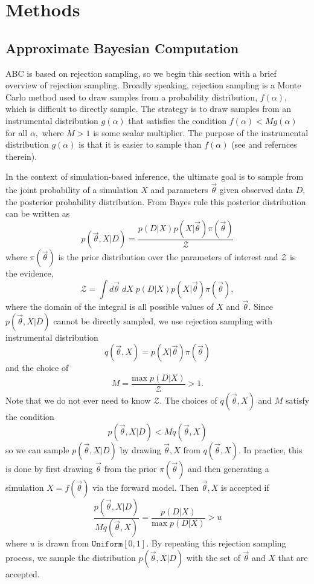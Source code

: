 \documentclass[fleqn,usenatbib]{mnras}
\newcommand{\beq}{\begin{equation}}
\newcommand{\eeq}{\end{equation}}
\newcommand{\pars}{\vec{\theta}}
\begin{document}
\section{Methods}\label{sec:method}
\subsection{Approximate Bayesian Computation} \label{sec:abc}
ABC is based on rejection sampling, so we begin this section with a brief overview of 
rejection sampling. Broadly speaking, rejection sampling is a Monte Carlo method 
used to draw samples from a probability distribution, $f(\alpha)$, which is difficult to directly sample. The strategy is to draw samples from an instrumental distribution $g(\alpha)$ that satisfies the condition $f(\alpha) < M g(\alpha)$ for all $\alpha,$ where $M > 1$ is some scalar multiplier. The purpose of the instrumental distribution $g(\alpha)$ is that it is easier to sample than $f(\alpha)$ (see \citealt{bishop} and refernces therein). 

In the context of simulation-based inference, 
the ultimate goal is to sample from the joint probability of a
simulation $X$ and parameters $\pars$ given observed data $D$, the
posterior probability distribution. From Bayes rule this posterior 
distribution can be written as 
\beq
p(\pars, X | D) = \frac{p(D|X)p(X|\pars)\pi(\pars)}{\mathcal{Z}}
\eeq
where $\pi(\pars)$ is the prior distribution over the parameters of 
interest and $\mathcal{Z}$ is the evidence, 
\beq
\mathcal{Z} = \int d\pars \; dX\; p(D|X) p(X|\pars) \pi(\pars), 
\eeq
where the domain of the integral is all possible values of $X$ and $\pars$. 
Since $p(\pars, X | D)$ cannot be directly sampled, we use rejection 
sampling with instrumental distribution 
\beq
q(\pars, X) = p(X|\pars) \pi(\pars)
\eeq
and the choice of 
\beq
M = \frac{\mathrm{max}\; p(D|X)}{\mathcal{Z}} > 1.
\eeq
Note that we do not ever need to know $\mathcal{Z}$. 
The choices of $q(\pars, X)$ and $M$ satisfy the condition 
\beq
p(\pars, X | D) < M q(\pars, X)
\eeq
so we can sample $p(\pars, X | D)$ by drawing ${\pars, X}$ from $q(\pars, X)$.
In practice, this is done 
by first drawing $\pars$ from the prior $\pi(\pars)$ and then generating a 
simulation $X = f(\pars)$ via the forward model. Then ${\pars, X}$ 
is accepted if
\beq \label{eq:reject_samp}
\frac{p(\pars, X | D)}{M q(\pars, X)} = \frac{p(D|X)}{\mathrm{max}\;p(D|X)} > u 
\eeq
where $u$ is drawn from $\mathtt{Uniform}[0,1]$. By repeating this rejection sampling process, 
we sample the distribution $p(\pars, X |D)$ with the set of $\pars$ and $X$ that are accepted. 
\end{document}
